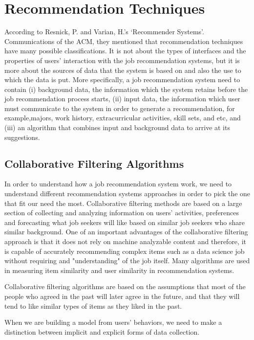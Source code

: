 \documentclass[sigconf]{acmart}
\begin{document}
\section{Recommendation Techniques}
According to Resnick, P. and Varian, H.'s ‘Recommender Systems’. Communications of the ACM, they mentioned that recommendation techniques have many possible classifications. It is not about the types of interfaces and the properties of users' interaction with the job recommendation systems, but it is more about the sources of data that the system is based on and also the use to which the data is put. More specifically, a job recommendation system need to contain (i) background data, the information which the system retains before the job recommendation process starts, (ii) input data, the information which user must communicate to the system in order to generate a recommendation, for example,majors, work history, extracurricular activities, skill sets, and etc, and (iii) an algorithm that combines input and background data to arrive at its suggestions.



\subsection{Collaborative Filtering Algorithms}
In order to understand how a job recommendation system work, we need to understand different recommendation systems approaches in order to pick the one that fit our need the most. Collaborative filtering methods are based on a large section of collecting and analyzing information on users' activities, preferences and forecasting what job seekers will like based on similar job seekers who share similar background. One of an important advantages of the collaborative filtering approach is that it does not rely on machine analyzable content and therefore, it is capable of accurately recommending complex items such as a data science job without requiring and "understanding" of the job itself. Many algorithms are used in measuring item similarity and user similarity in recommendation systems. 
\par Collaborative filtering algorithms are based on the assumptions that most of the people who agreed in the past will later agree in the future, and that they will tend to like similar types of items as they liked in the past.
\par When we are building a model from users' behaviors, we need to make a distinction between implicit and explicit forms of data collection.
\end{document}
